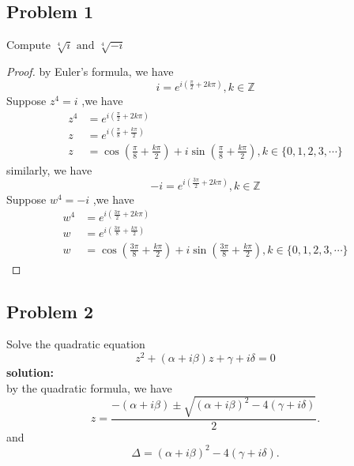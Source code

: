 \documentclass[letterpaper, 11pt]{article}
\newcommand{\1}{\mathds{1}}	%
\theoremstyle{definition}
\begin{document}
\subsection*{Problem 1}
Compute $ \sqrt[4]{i} \text{ and } \sqrt[4]{-i} $ 
\begin{proof}
    by Euler's formula, we have $$
        i=e^{i(\frac{\pi}{2}+2k\pi)},k\in\mathbb{Z}
    $$
    Suppose $ z^4=i $ ,we have \begin{align*}{}{}
    z^4&=e^{i(\frac{\pi}{2}+2k\pi)}\\
    z&=e^{i(\frac{\pi}{8}+\frac{k\pi}{2})}\\
    z&=\cos(\frac{\pi}{8}+\frac{k\pi}{2})+i\sin(\frac{\pi}{8}+\frac{k\pi}{2}),k\in\{0,1,2,3,\cdots\}
    \end{align*}
similarly, we have $$
    -i=e^{i(\frac{3\pi}{2}+2k\pi)},k\in\mathbb{Z}
$$
Suppose $ w^4=-i $ ,we have \begin{align*}{}{}
    w^4&=e^{i(\frac{3\pi}{2}+2k\pi)}\\
    w&=e^{i(\frac{3\pi}{8}+\frac{k\pi}{2})}\\
    w&=\cos(\frac{3\pi}{8}+\frac{k\pi}{2})+i\sin(\frac{3\pi}{8}+\frac{k\pi}{2}),k\in\{0,1,2,3,\cdots\}
    \end{align*}
\end{proof}
\subsection*{Problem 2}
Solve the quadratic equation $$
    z^2+(\alpha+i\beta)z+\gamma+i\delta=0
$$ 
\textbf{solution:}
\\by the quadratic formula, we have 
\[
z = \frac{- (\alpha + i \beta) \pm \sqrt{(\alpha + i\beta)^2 - 4(\gamma + i\delta)}}{2}.
\]
and \[
\Delta = (\alpha + i\beta)^2 - 4(\gamma + i\delta).
\]
\end{document}
